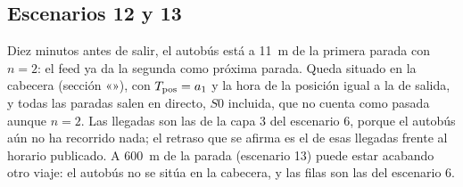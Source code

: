 \subsection{Escenarios 12 y 13} Diez minutos antes de salir, el autobús está a 11~m de la primera parada con $n=2$: el feed
ya da la segunda como próxima parada. Queda situado en la cabecera (sección «»), con
$T_{\mathrm{pos}}=a_1$ y la hora de la posición igual a la de salida, y todas las paradas salen en directo, $S0$ incluida, que no
cuenta como pasada aunque $n=2$.
Las llegadas son las de la capa 3 del escenario 6, porque el autobús aún no ha recorrido nada; el retraso que se
afirma es el de esas llegadas frente al horario publicado. A 600~m de la parada (escenario 13) puede estar acabando
otro viaje: el autobús no se sitúa en la cabecera, y las filas son las del escenario 6.

